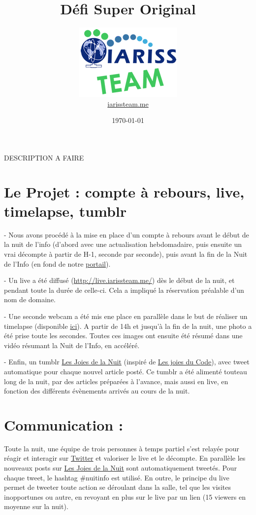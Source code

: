 \documentclass[12pt, a4paper]{article}
\title{Défi Super Original}
\newcommand{\espace}{\vspace{.8cm}}
\begin{document}
\author{\includegraphics{../_img/iariss_team.png} \\ {\sffamily \href{http://iarissteam.me}{iarissteam.me}}}
\date{\today}

\maketitle{}

{\sffamily DESCRIPTION A FAIRE} 

\espace{}
\section{Le Projet : compte à rebours, live, timelapse, tumblr}
 
- Nous avons procédé à la mise en place d'un compte à rebours avant le début de la nuit de l'info (d'abord avec une actualisation hebdomadaire, puis ensuite un vrai décompte à partir de H-1, seconde par seconde), puis avant la fin de la Nuit de l'Info (en fond de notre \href{http://iarissteam.me/}{portail}).

- Un live a été diffusé (\href{http://live.iarissteam.me/}{http://live.iarissteam.me/}) dès le début de la nuit, et pendant toute la durée de celle-ci. Cela a impliqué la réservation préalable d'un nom de domaine.

- Une seconde webcam a été mis ene place en parallèle dans le but de réaliser un timelapse (disponible \href{ici}{ici}). A partir de 14h et jusqu'à la fin de la nuit, une photo a été prise toute les secondes. Toutes ces images ont ensuite été résumé dans une vidéo résumant la Nuit de l'Info, en accéléré.

- Enfin, un tumblr \href{http://lesjoiesdelanuit.tumblr.com/}{Les Joies de la Nuit} (inspiré de \href{http://lesjoiesducode.tumblr.com/}{Les joies du Code}), avec tweet automatique pour chaque nouvel article posté. Ce tumblr a été alimenté touteau long de la nuit, par des articles préparées à l'avance, mais aussi en \og{}live\fg{}, en fonction des différents évènements arrivés au cours de la nuit.

\espace{}
\section{Communication : }
Toute la nuit, une équipe de trois personnes à temps partiel s’est relayée pour réagir et interagir sur \href{https://twitter.com/}{Twitter} et valoriser le live et le décompte. En parallèle les nouveaux posts sur \href{http://lesjoiesdelanuit.tumblr.com/}{Les Joies de la Nuit} sont automatiquement tweetés. Pour chaque tweet, le hashtag \#nuitinfo est utilisé.
En outre, le principe du live permet de tweeter toute action se déroulant dans la salle, tel que les visites inopportunes ou autre, en revoyant en plus sur le live par un lien (15 viewers en moyenne sur la nuit).
\end{document}
